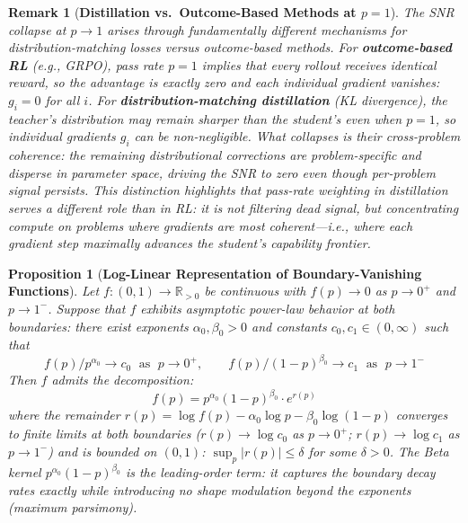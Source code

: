 \documentclass{article}
\newtheorem{proposition}[theorem]{Proposition}
\newtheorem{remark}{Remark}
\begin{document}
\begin{remark}[\textbf{Distillation vs.\ Outcome-Based Methods at $p = 1$}]
\label{rem:distill_vs_rl}
The SNR collapse at $p \to 1$ arises through fundamentally different mechanisms for distribution-matching losses versus outcome-based methods. For \textbf{outcome-based RL} (e.g., GRPO), pass rate $p = 1$ implies that every rollout receives identical reward, so the advantage is exactly zero and \emph{each individual gradient vanishes}: $g_i = 0$ for all $i$. For \textbf{distribution-matching distillation} (KL divergence), the teacher's distribution may remain sharper than the student's even when $p = 1$, so individual gradients $g_i$ can be non-negligible. What collapses is their \emph{cross-problem coherence}: the remaining distributional corrections are problem-specific and disperse in parameter space, driving the SNR to zero even though per-problem signal persists. This distinction highlights that pass-rate weighting in distillation serves a different role than in RL: it is not filtering dead signal, but \emph{concentrating compute on problems where gradients are most coherent}---i.e., where each gradient step maximally advances the student's capability frontier.
\end{remark}

\begin{proposition}[\textbf{Log-Linear Representation of Boundary-Vanishing Functions}]
\label{prop:representation}
Let $f: (0,1) \to \mathbb{R}_{>0}$ be continuous with $f(p) \to 0$ as $p \to 0^+$ and $p \to 1^-$. Suppose that $f$ exhibits \emph{asymptotic power-law behavior} at both boundaries: there exist exponents $\alpha_0, \beta_0 > 0$ and constants $c_0, c_1 \in (0,\infty)$ such that
\begin{equation}
  f(p)/p^{\alpha_0} \to c_0 \;\text{ as }\; p \to 0^+, \qquad f(p)/(1-p)^{\beta_0} \to c_1 \;\text{ as }\; p \to 1^-
\end{equation}
Then $f$ admits the decomposition:
\begin{equation}
  f(p) = p^{\alpha_0}(1-p)^{\beta_0} \cdot e^{r(p)}
  \label{eq:log_linear_decomp}
\end{equation}
where the remainder $r(p) = \log f(p) - \alpha_0 \log p - \beta_0 \log(1-p)$ converges to finite limits at both boundaries ($r(p) \to \log c_0$ as $p \to 0^+$; $r(p) \to \log c_1$ as $p \to 1^-$) and is bounded on $(0,1)$: $\sup_p|r(p)| \leq \delta$ for some $\delta > 0$. The Beta kernel $p^{\alpha_0}(1-p)^{\beta_0}$ is the leading-order term: it captures the boundary decay rates exactly while introducing no shape modulation beyond the exponents (maximum parsimony).
\end{proposition}
\end{document}
